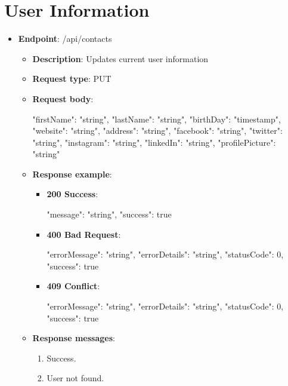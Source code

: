 \section{User Information}\label{sec:user-information}
\begin{itemize}
    \item \textbf{Endpoint}: /api/contacts
    \begin{itemize}
        \item \textbf{Description}: Updates current user information
        \item \textbf{Request type}: PUT
        \item \textbf{Request body}:
        \begin{spverbatim}
        {
            "firstName": "string",
            "lastName": "string",
            "birthDay": "timestamp",
            "website": "string",
            "address": "string",
            "facebook": "string",
            "twitter": "string",
            "instagram": "string",
            "linkedIn": "string",
            "profilePicture": "string"
        }
        \end{spverbatim}
        \item \textbf{Response example}:
        \begin{itemize}
            \item \textbf{200 Success}:
            \begin{spverbatim}
            {
                "message": "string",
                "success": true
            }
            \end{spverbatim}
            \item \textbf{400 Bad Request}:
            \begin{spverbatim}
            {
                "errorMessage": "string",
                "errorDetails": "string",
                "statusCode": 0,
                "success": true
            }
            \end{spverbatim}
            \item \textbf{409 Conflict}:
            \begin{spverbatim}
            {
                "errorMessage": "string",
                "errorDetails": "string",
                "statusCode": 0,
                "success": true
            }
            \end{spverbatim}
        \end{itemize}
        \item \textbf{Response messages}:
        \begin{enumerate}
            \item Success.
            \item User not found.
        \end{enumerate}
    \end{itemize}
\end{itemize}